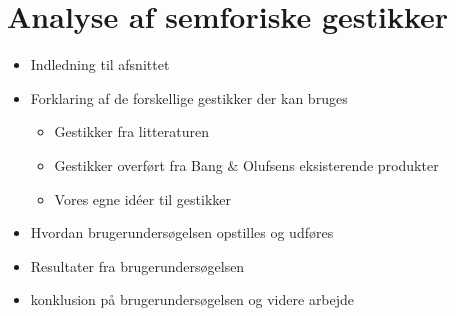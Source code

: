 \chapter{Analyse af semforiske gestikker}
\label{AnalyseAfSemaforiskeGestikker}
%

\begin{itemize}
  \item Indledning til afsnittet
  \item Forklaring af de forskellige gestikker der kan bruges
  \begin{itemize}
  	\item Gestikker fra litteraturen
  	\item Gestikker overført fra Bang $\&$ Olufsens eksisterende produkter
  	\item Vores egne idéer til gestikker
  \end{itemize}
  \item Hvordan brugerundersøgelsen opstilles og udføres
  \item Resultater fra brugerundersøgelsen
  \item konklusion på brugerundersøgelsen og videre arbejde
\end{itemize}



